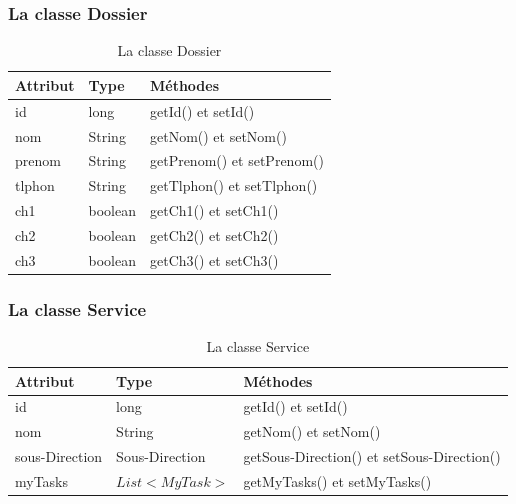  \subsubsection{La classe Dossier}
 \begin{table}[H]
 	\centering\setlength\tabcolsep{1cm}
 	
 	\begin{tabular}{|l|l|l|}
 		\hline
 		\textbf{Attribut}  & \textbf{Type} & \multicolumn{1}{l|}{\textbf{Méthodes}} \\ \hline
 		
 		id & long & getId() et setId()\\ \cline{1-2}
 		nom & String & getNom() et setNom()\\ \cline{1-2}
 		prenom & String & getPrenom() et setPrenom()\\ \cline{1-2}
 		tlphon & String & getTlphon() et setTlphon()\\ \cline{1-2}
 		ch1 & boolean  & getCh1() et setCh1()\\ \cline{1-2}   
 		ch2 & boolean  & getCh2() et setCh2() \\ \cline{1-2}
 		ch3 & boolean  & getCh3() et setCh3() 
 		\\ \hline
 	\end{tabular}
 	\caption{La classe Dossier}
 	\label{fig:class8}
 \end{table}
 
 

\subsubsection{La classe Service}
\begin{table}[H]
	\centering
	\begin{tabular}{|l|l|l|}
		\hline
		\textbf{Attribut}  & \textbf{Type} & \multicolumn{1}{l|}{\textbf{Méthodes}} \\ \hline
		
		id & long & getId() et setId()\\ \cline{1-2}
		nom & String  & getNom() et setNom() \\ \cline{1-2}
				sous-Direction & Sous-Direction  & getSous-Direction() et setSous-Direction() \\ \cline{1-2}
		myTasks	& $ List<MyTask> $ & getMyTasks() et setMyTasks()   \\ \hline
	\end{tabular}
	\caption{La classe Service}
\label{fig:class2}
\end{table}


